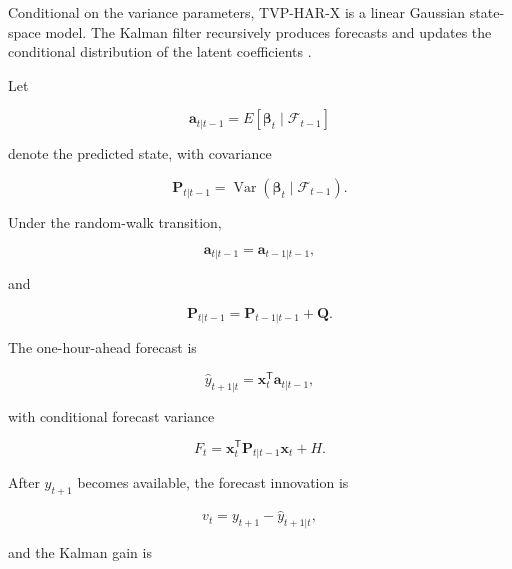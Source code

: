 Conditional on the variance parameters, TVP-HAR-X is a linear
Gaussian state-space model. The Kalman filter recursively
produces forecasts and updates the conditional distribution of
the latent coefficients \citep{kalman1960,durbin2012}.

Let

\begin{equation}
\mathbf{a}_{t|t-1}
=
E
\left[
\boldsymbol{\beta}_t
\mid
\mathcal{F}_{t-1}
\right]
\label{eq:predicted-state}
\end{equation}

denote the predicted state, with covariance

\begin{equation}
\mathbf{P}_{t|t-1}
=
\operatorname{Var}
\left(
\boldsymbol{\beta}_t
\mid
\mathcal{F}_{t-1}
\right).
\label{eq:predicted-state-covariance}
\end{equation}

Under the random-walk transition,

\begin{equation}
\mathbf{a}_{t|t-1}
=
\mathbf{a}_{t-1|t-1},
\label{eq:kalman-state-prediction}
\end{equation}

and

\begin{equation}
\mathbf{P}_{t|t-1}
=
\mathbf{P}_{t-1|t-1}
+
\mathbf{Q}.
\label{eq:kalman-covariance-prediction}
\end{equation}

The one-hour-ahead forecast is

\begin{equation}
\widehat{y}_{t+1|t}
=
\mathbf{x}_t^{\mathsf{T}}
\mathbf{a}_{t|t-1},
\label{eq:kalman-observation-forecast}
\end{equation}

with conditional forecast variance

\begin{equation}
F_t
=
\mathbf{x}_t^{\mathsf{T}}
\mathbf{P}_{t|t-1}
\mathbf{x}_t
+
H.
\label{eq:kalman-forecast-variance}
\end{equation}

After \(y_{t+1}\) becomes available, the forecast innovation is

\begin{equation}
v_t
=
y_{t+1}
-
\widehat{y}_{t+1|t},
\label{eq:kalman-innovation}
\end{equation}

and the Kalman gain is

